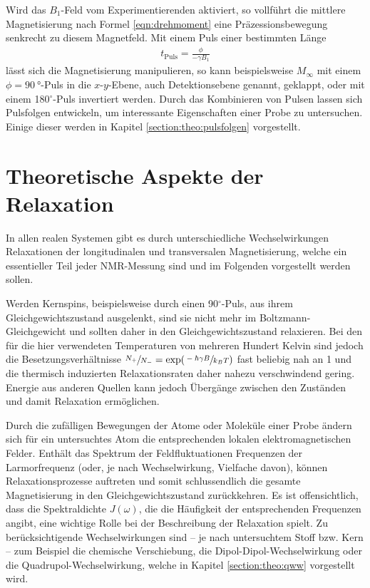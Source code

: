 Wird das $B_1$-Feld vom Experimentierenden aktiviert, so vollführt die mittlere Magnetisierung nach Formel \eqref{eqn:drehmoment} eine Präzessionsbewegung senkrecht zu diesem Magnetfeld. Mit einem Puls einer bestimmten Länge
\begin{align}
	t_\text{Puls} = \frac{\phi}{- \gamma B_1} \label{eqn:theo:pulslaenge}
\end{align}
lässt sich die Magnetisierung manipulieren, so kann beispielsweise $M_\infty$ mit einem $\phi = \SI{90}{\degree}$-Puls in die $x$-$y$-Ebene, auch Detektionsebene genannt, geklappt, oder mit einem 180$^\circ$-Puls invertiert werden. Durch das Kombinieren von Pulsen lassen sich Pulsfolgen entwickeln, um interessante Eigenschaften einer Probe zu untersuchen. Einige dieser werden in Kapitel \ref{section:theo:pulsfolgen} vorgestellt.



\section{Theoretische Aspekte der Relaxation} \label{section:theo:relax}

In allen realen Systemen gibt es durch unterschiedliche Wechselwirkungen Relaxationen der longitudinalen und transversalen Magnetisierung, welche ein essentieller Teil jeder NMR-Messung sind und im Folgenden vorgestellt werden sollen.

Werden Kernspins, beispielsweise durch einen 90$^\circ$-Puls, aus ihrem Gleichgewichtszustand ausgelenkt, sind sie nicht mehr im Boltzmann-Gleichgewicht und sollten daher in den Gleichgewichtszustand relaxieren. Bei den für die hier verwendeten Temperaturen von mehreren Hundert Kelvin sind jedoch die Besetzungsverhältnisse $\sfrac{N_+}{N_-} = \exp (\sfrac{- \hbar \gamma B}{k_B T})$ fast beliebig nah an 1 und die thermisch induzierten Relaxationsraten daher nahezu verschwindend gering. Energie aus anderen Quellen kann jedoch Übergänge zwischen den Zuständen und damit Relaxation ermöglichen.

Durch die zufälligen Bewegungen der Atome oder Moleküle einer Probe ändern sich für ein untersuchtes Atom die entsprechenden lokalen elektromagnetischen Felder. Enthält das Spektrum der Feldfluktuationen Frequenzen der Larmorfrequenz (oder, je nach Wechselwirkung, Vielfache davon), können Relaxationsprozesse auftreten und somit schlussendlich die gesamte Magnetisierung in den Gleichgewichtszustand zurückkehren. Es ist offensichtlich, dass die Spektraldichte $J(\omega)$, die die Häufigkeit der entsprechenden Frequenzen angibt, eine wichtige Rolle bei der Beschreibung der Relaxation spielt. Zu berücksichtigende Wechselwirkungen sind -- je nach untersuchtem Stoff bzw. Kern -- zum Beispiel die chemische Verschiebung, die Dipol-Dipol-Wechselwirkung oder die Quadrupol-Wechselwirkung, welche in Kapitel \ref{section:theo:qww} vorgestellt wird.

